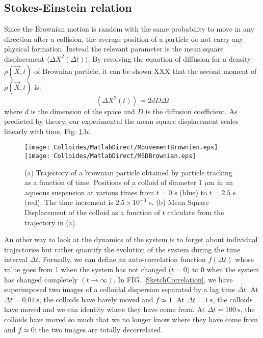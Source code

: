 \documentclass[%
 aip,
 jmp,%
 amsmath,amssymb,
reprint,%
]{revtex4-1}
\begin{document}
\subsection{Stokes-Einstein relation}

Since the Brownian motion is random with the same probability to move in any direction after a collision, the average position of a particle do not carry any physical formation. Instead the relevant parameter is the mean square displacement \citep{11_ken2003molecular} $\langle \Delta X^2(\Delta t) \rangle$. By resolving the equation of diffusion for a density $\rho(\vec{X}, t)$ of Brownian particle, it can be shown XXX that the second moment of $\rho(\vec{X}, t)$ is:
\begin{equation}
\left\langle \Delta X^2(t) \right\rangle = 2dD \Delta t
\label{eq:msd}
\end{equation}
where $d$ is the dimension of the space and $D$ is the diffusion coefficient. As predicted by theory, our experimental the mean square displacement scales linearly with time, Fig. \ref{BrownianTrajectory}.b.

\begin{figure}
	\texttt{[image: Colloides/MatlabDirect/MouvementBrownien.eps]}\\
	\texttt{[image: Colloides/MatlabDirect/MSDBrownian.eps]}
	\caption{(a) Trajectory of a brownian particle obtained by particle tracking as a function of time. Positions of a colloid of diameter 1 $\mu$m in an aqueous suspension at various times from $t=0$ s (blue) to $t=2.5$ s (red). The time increment is $2.5 \times 10^{-3}$ s. (b) Mean Square Displacement of the colloid as a function of $t$ calculate from the trajectory in (a). }
	\label{BrownianTrajectory}
\end{figure}



An other way to look at the dynamics of the system is to forget about individual trajectories but rather quantify the evolution of the system during the time interval $\Delta t$. Formally, we can define an auto-correlation function $f(\Delta t)$ whose value goes from 1 when the system has not changed ($t=0$) to 0 when the system has changed completely $(t\rightarrow\infty)$. In FIG. \ref{SketchCorrelation}, we have superimposed two images of a colloidal dispersion separated by a lag time $\Delta t$. At $\Delta t = \SI{0.01}{\second}$, the colloids have barely moved and $f \simeq 1$. At $\Delta t = \SI{1}{\second}$, the colloids have moved and we can identity where they have come from.  At $\Delta t = \SI{100}{\second}$, the colloids have moved so much that we no longer know where they have come from and $f \simeq 0$: the two images are totally decorrelated.
\end{document}
